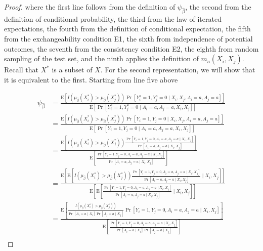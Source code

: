 \begin{proof}
where the first line follows from the definition of $\psi_{\widehat{\beta}}$, the second from the definition of conditional probability, the third from the law of iterated expectations, the fourth from the definition of conditional expectation, the fifth from the exchangeability condition E1, the sixth from independence of potential outcomes, the seventh from the consistency condition E2, the eighth from random sampling of the test set, and the ninth applies the definition of $m_a(X_i, X_j)$. Recall that $X^*$ is a subset of $X$. For the second representation, we will show that it is equivalent to the first. Starting from line five above

$$
\begin{aligned}
\psi_{\widehat{\beta}}&= \frac{\mathrm{E}\left[I\left(\mu_{\widehat{\beta}}(X_i^*)>\mu_{\widehat{\beta}}(X_j^*)\right) \operatorname{Pr}\left[Y^a_i=1, Y^a_j=0  \mid X_i, X_j, A_i = a, A_j = a\right]\right]}{\mathrm{E}\left[\operatorname{Pr}\left[Y^a_i=1, Y^a_j=0  \mid A_i = a, A_j = a, X_i, X_j\right]\right]} \\
&= \frac{\mathrm{E}\left[I\left(\mu_{\widehat{\beta}}(X_i^*)>\mu_{\widehat{\beta}}(X_j^*)\right) \operatorname{Pr}\left[Y_i=1, Y_j=0  \mid X_i, X_j, A_i = a, A_j = a\right]\right]}{\mathrm{E}\left[\operatorname{Pr}\left[Y_i=1, Y_j=0  \mid A_i = a, A_j = a, X_i, X_j\right]\right]} \\
&= \frac{\mathrm{E}\left[I\left(\mu_{\widehat{\beta}}(X_i^*)>\mu_{\widehat{\beta}}(X_j^*)\right) \frac{\operatorname{Pr}\left[Y_i=1, Y_j=0, A_i = a, A_j = a \mid X_i, X_j\right]}{\operatorname{Pr}\left[A_i = a, A_j = a \mid X_i, X_j\right]}\right]}{\mathrm{E}\left[\frac{\operatorname{Pr}\left[Y_i=1, Y_j=0, A_i = a, A_j = a \mid X_i, X_j\right]}{\operatorname{Pr}\left[A_i = a, A_j = a \mid X_i, X_j\right]}\right]} \\
&= \frac{\mathrm{E}\left[\mathrm{E}\left[I\left(\mu_{\widehat{\beta}}(X_i^*)>\mu_{\widehat{\beta}}(X_j^*)\right) \frac{\operatorname{Pr}\left[Y_i=1, Y_j=0, A_i = a, A_j = a \mid X_i, X_j\right]}{\operatorname{Pr}\left[A_i = a, A_j = a \mid X_i, X_j\right]} \mid X_i, X_j\right]\right]}{\mathrm{E}\left[\mathrm{E}\left[\frac{\operatorname{Pr}\left[Y_i=1, Y_j=0, A_i = a, A_j = a \mid X_i, X_j\right]}{\operatorname{Pr}\left[A_i=a, A_j = a \mid X_i, X_j\right]} \mid X_i, X_j\right]\right]} \\
&= \frac{\mathrm{E}\left[\frac{I\left(\mu_{\widehat{\beta}}(X_i^*)>\mu_{\widehat{\beta}}(X_j^*)\right)}{\operatorname{Pr}\left[A_i = a \mid X_i\right] \operatorname{Pr}\left[A_j = a \mid X_j\right]} \operatorname{Pr}\left[Y_i=1, Y_j=0, A_i = a, A_j = a \mid X_i, X_j\right]\right]}{\mathrm{E}\left[\frac{\operatorname{Pr}\left[Y_i=1, Y_j=0, A_i = a, A_j = a \mid X_i, X_j\right]}{\operatorname{Pr}[A_i = a \mid X_i] \Pr[A_j = a \mid X_j]}\right]} \\

\end{aligned}$$
\end{proof}
